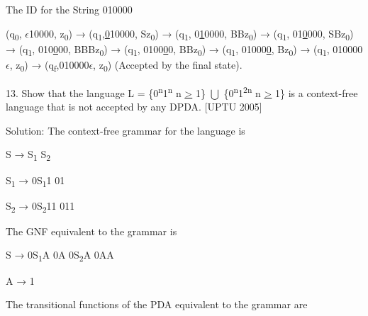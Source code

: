 \documentclass[]{article}
\begin{document}
The ID for the String 010000

\begin{flushleft}
(q\textsubscript{0}, \underline{$\epsilon$}10000, z\textsubscript{0}) → (q\textsubscript{1},\underline{0}10000, Sz\textsubscript{0}) → (q\textsubscript{1}, 0\underline{1}0000, BBz\textsubscript{0}) → (q\textsubscript{1}, 01\underline{0}000, SBz\textsubscript{0}) → (q\textsubscript{1}, 010\underline{0}00, BBBz\textsubscript{0}) → (q\textsubscript{1}, 0100\underline{0}0, BBz\textsubscript{0}) → (q\textsubscript{1}, 01000\underline{0}, Bz\textsubscript{0}) → (q\textsubscript{1}, 010000$\epsilon$, z\textsubscript{0}) → (q\textsubscript{f},010000$\epsilon$, z\textsubscript{0}) (Accepted by the final state).
\end{flushleft}



13. Show that the language L = \{0\textsuperscript{n}1\textsuperscript{n} \textbar{} n \underline{\textgreater{}} 1\} $\bigcup$ \{0\textsuperscript{n}1\textsuperscript{2n} \textbar{} n \underline{\textgreater{}} 1\} is a context-free language that is not accepted by any DPDA. [UPTU 2005]

Solution: The context-free grammar for the language is

\begin{center}
S → S\textsubscript{1} \textbar{} S\textsubscript{2}
\end{center}
\begin{center}
	S\textsubscript{1} → 0S\textsubscript{1}1 \textbar{} 01
\end{center}
\begin{center}
	S\textsubscript{2} → 0S\textsubscript{2}11 \textbar{} 011
\end{center}

The GNF equivalent to the grammar is

\begin{center}
	S → 0S\textsubscript{1}A \textbar{} 0A \textbar{} 0S\textsubscript{2}A \textbar{} 0AA 
\end{center}
\begin{center}
A → 1
\end{center}

The transitional functions of the PDA equivalent to the grammar are
\end{document}

